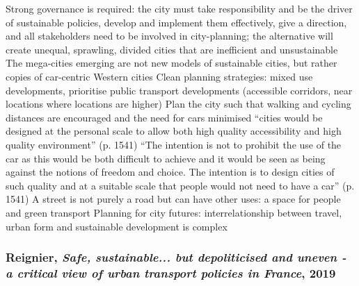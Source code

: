 \documentclass{article}
\begin{document}
\begin{outline}
		\2 Strong governance is required: the city must take responsibility and be the driver of sustainable policies, develop and implement them effectively, give a direction, and all stakeholders need to be involved in city-planning; the alternative will create unequal, sprawling, divided cities that are inefficient and unsustainable 
		\2 The mega-cities emerging are not new models of sustainable cities, but rather copies of car-centric Western cities
	\1 Clean planning strategies: mixed use developments, prioritise public transport developments (accessible corridors, near locations where locations are higher)
		\2 Plan the city such that walking and cycling distances are encouraged and the need for cars minimised
		\2 ``cities would be designed at the personal scale to allow both high quality accessibility and high quality environment'' (p. 1541)
		\2 ``The intention is not to prohibit the use of the car as this would be both difficult to achieve and it would be seen as being against the notions of freedom and choice. The intention is to design cities of such quality and at a suitable scale that people would not need to have a car'' (p. 1541)
	\1 A street is not purely a road but can have other uses: a space for people and green transport
	\1 Planning for city futures: interrelationship between travel, urban form and sustainable development is complex
\end{outline}


\subsubsection{Reignier, \textit{Safe, sustainable... but depoliticised and uneven - a critical view of urban transport policies in France}, 2019}
\end{document}

